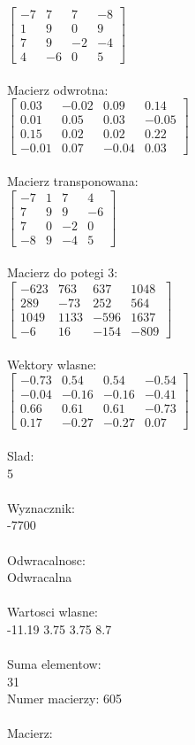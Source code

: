 \documentclass[a4paper,12pt]{article}
\begin{document}
$\begin{bmatrix} -7&7&7&-8\\1&9&0&9\\7&9&-2&-4\\4&-6&0&5 \end{bmatrix}$
\\
\\
Macierz odwrotna:\\

$\begin{bmatrix} 0.03&-0.02&0.09&0.14\\0.01&0.05&0.03&-0.05\\0.15&0.02&0.02&0.22\\-0.01&0.07&-0.04&0.03 \end{bmatrix}$
\\
\\
Macierz transponowana:\\

$\begin{bmatrix} -7&1&7&4\\7&9&9&-6\\7&0&-2&0\\-8&9&-4&5 \end{bmatrix}$
\\
\\
Macierz do potegi 3:\\

$\begin{bmatrix} -623&763&637&1048\\289&-73&252&564\\1049&1133&-596&1637\\-6&16&-154&-809 \end{bmatrix}$
\\
\\
Wektory wlasne:\\

$\begin{bmatrix} -0.73&0.54&0.54&-0.54\\-0.04&-0.16&-0.16&-0.41\\0.66&0.61&0.61&-0.73\\0.17&-0.27&-0.27&0.07 \end{bmatrix}$
\\
\\
Slad:\\
5
\\
\\
Wyznacznik:\\
-7700
\\
\\
Odwracalnosc:\\
Odwracalna
\\
\\
Wartosci wlasne:\\
-11.19 3.75 3.75 8.7
\\
\\
Suma elementow:\\
31
\\
\newpage
Numer macierzy:
605
\\
\\
Macierz:\\
\end{document}
